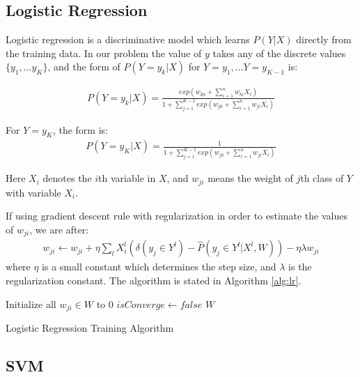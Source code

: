 \subsection{Logistic Regression}

Logistic regression is a discriminative model which learns $P(Y|X)$ directly from the training data. In our problem the value of $y$ takes any of the discrete values $\{y_1,...y_K\}$, and the form of $P(Y=y_k|X)$ for $Y=y_1,...Y=y_{K-1}$ is: 

\begin{gather}
	P(Y=y_k|X)=\frac{exp(w_{k0}+\sum_{i=1}^n{w_{ki}X_i})}{1+\sum_{j=1}^{K-1}exp(w_{j0}+\sum_{i=1}^n{w_{ji}X_i})}
\end{gather}

For $Y=y_K$, the form is:
\begin{gather}
	P(Y=y_K|X)=\frac{1}{1+\sum_{j=1}^{K-1}exp(w_{j0}+\sum_{i=1}^n{w_{ji}X_i})}
\end{gather}

Here $X_i$ denotes the $i$th variable in $X$, and $w_{ji}$ means the weight of $j$th class of $Y$ with variable $X_i$.

If using gradient descent rule with regularization in order to estimate the values of $w_{ji}$, we are after:
\begin{gather}
	w_{ji} \leftarrow w_{ji}+ \eta \sum_{l}X_{i}^{l}(\delta (y_{j} \in Y^{l})-\hat{P}(y_{j} \in Y^{l}|X^{l},W))- \eta \lambda w_{ji}
\end{gather}
where $\eta$ is a small constant which determines the step size, and $\lambda$ is the regularization constant. The algorithm is stated in Algorithm \ref{alg:lr}.

\IncMargin{1em}
\begin{algorithm}
\label{alg:lr}
\BlankLine
Initialize all $w_{ji} \in W$ to 0\;
$isConverge \leftarrow false$\;
\Return $W$\;
\caption{Logistic Regression Training Algorithm}\label{algo_disjdecomp}
\end{algorithm}
\DecMargin{1em}


\subsection{SVM}

